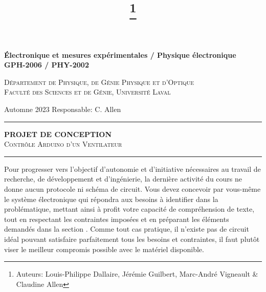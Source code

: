 \documentclass[english,french,12pt]{article}
\title{\vspace{-7em}\thanks{Auteurs: Louis-Philippe Dallaire, Jérémie Guilbert, Marc-André Vigneault \& Claudine Allen}}
\date{}
\begin{document}
\maketitle\thispagestyle{fancy}
%
%
\begin{center}
    \textbf{\large{Électronique et mesures expérimentales / Physique électronique}}\\
    \vspace{0.2em}
    \textbf{GPH-2006 / PHY-2002}

    \textsc{Département de Physique, de Génie Physique et d'Optique\\
    Faculté des Sciences et de Génie, Université Laval}
\end{center}

\vspace{-1em}
\noindent Automne 2023 \hfill Responsable: C. Allen\par
\vspace{0.2ex}
\hrule
\vspace{0.5ex}
\centering
    \textbf{PROJET DE CONCEPTION}\\
    \textsc{Contrôle Arduino d'un Ventilateur}\par
\vspace{2ex}
\hrule
\justify
\vspace{-1ex}
Pour progresser vers l'objectif d'autonomie et d'initiative nécessaires au travail de recherche, de développement et d'ingénierie, la dernière activité du cours ne donne aucun protocole ni schéma de circuit. Vous devez concevoir par vous-même le système électronique qui répondra aux besoins à identifier dans la problématique, mettant ainsi à profit votre capacité de compréhension de texte, tout en respectant les contraintes imposées et en préparant les éléments demandés dans la section . Comme tout cas pratique, il n'existe pas de circuit idéal pouvant satisfaire parfaitement tous les besoins et contraintes, il faut plutôt viser le meilleur compromis possible avec le matériel disponible.
\end{document}

